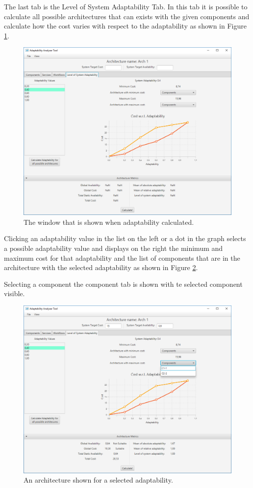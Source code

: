 The last tab is the Level of System Adaptability Tab. In this tab it is possible to calculate all possible architectures that can exists with the given components and calculate how the cost varies with respect to the adaptability as shown in Figure \ref{fig:adapt-wrt-avail}. 

\begin{figure}[!ht]
	\centerline
	{\includegraphics[scale=0.50]{img/adapt_wrt_avail.png}}
	\caption[Availability Window]{The window that is shown when adaptability calculated.}
	\label{fig:adapt-wrt-avail}
\end{figure}

Clicking an adaptability value in the list on the left or a dot in the graph selects a possible adaptability value and displays on the right the minimum and maximum cost for that adaptability and the list of components that are in the architecture with the selected adaptability as shown in Figure \ref{fig:adapt-wrt-avail-comp}. 

Selecting a component the component tab is shown with te selected component visible.

\begin{figure}[!ht]
	\centerline
	{\includegraphics[scale=0.50]{img/adapt_wrt_avail_comp.png}}
	\caption[Availability Window with Architecture]{An architecture shown for a selected adaptability.}
	\label{fig:adapt-wrt-avail-comp}
\end{figure}
